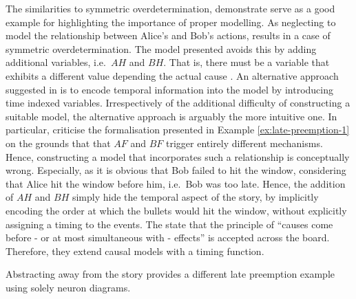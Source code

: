 \documentclass[11pt,a4paper]{book}
\theoremstyle{definition}
\theoremstyle{definition}
\theoremstyle{definition}
\theoremstyle{remark}
\begin{document}
%
%
%
%
The similarities to symmetric overdetermination, demonstrate serve as a good example for highlighting the importance of proper modelling.
As neglecting to model the relationship between Alice's and Bob's actions, results in a case of symmetric overdetermination. 
The model presented avoids this by adding additional variables, i.e.\ $AH$ and $BH$. That  is, there must be a variable that exhibits a different value depending the actual cause \parencite{halpern2011actual}.
An alternative approach suggested in \parencite[p.~34]{halpern2016actual} is to encode temporal information into the model by introducing time indexed variables.
Irrespectively of the additional difficulty of constructing a suitable model, the alternative approach is arguably the more intuitive one. In particular, \parencite{beckers2018principled} criticise the formalisation presented in 
Example \ref{ex:late-preemption-1} on the grounds that that $AF$ and $BF$ trigger entirely different mechanisms. Hence, constructing a model that incorporates such a relationship is conceptually wrong.
Especially, as it is obvious that Bob failed to hit the window, considering that Alice hit the window before him, i.e.\ Bob was too late. Hence, the addition of $AH$ and $BH$ simply hide the temporal aspect of the story, by implicitly encoding the order at which the bullets would hit the window, without explicitly assigning a timing to the events.
The state that the principle of ``causes come before - or at most simultaneous with - effects'' is accepted across the board. Therefore, they extend causal models with a timing function.

Abstracting away from the story \parencite{baumgartner2013regularity} provides a different late preemption example using solely neuron diagrams. 
\end{document}
